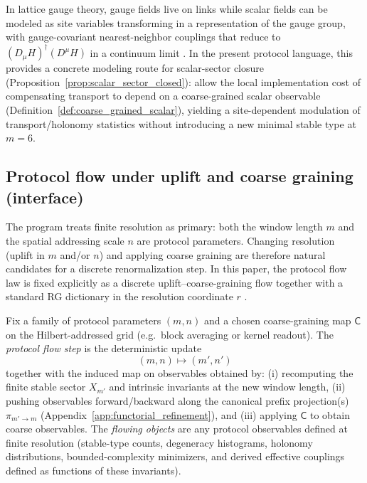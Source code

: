 \begin{remark}
In lattice gauge theory, gauge fields live on links while scalar fields can be modeled as site variables transforming in a representation of the gauge group, with gauge-covariant nearest-neighbor couplings that reduce to $(D_\mu H)^\dagger(D^\mu H)$ in a continuum limit \cite{Wilson1974,KogutSusskind1975HamiltonianLGT,Rothe2012}.
In the present protocol language, this provides a concrete modeling route for scalar-sector closure (Proposition~\ref{prop:scalar_sector_closed}): allow the local implementation cost of compensating transport to depend on a coarse-grained scalar observable (Definition~\ref{def:coarse_grained_scalar}), yielding a site-dependent modulation of transport/holonomy statistics without introducing a new minimal stable type at $m=6$.
\end{remark}

\subsection{Protocol flow under uplift and coarse graining (interface)}
\label{subsec:protocol_flow_interface}

The program treats finite resolution as primary: both the window length $m$ and the spatial addressing scale $n$ are protocol parameters.
Changing resolution (uplift in $m$ and/or $n$) and applying coarse graining are therefore natural candidates for a discrete renormalization step.
In this paper, the protocol flow law is fixed explicitly as a discrete uplift--coarse-graining flow together with a standard RG dictionary in the resolution coordinate $r$ \cite{Wilson1974,Rothe2012}.


\begin{definition}\label{def:protocol_flow_step}
Fix a family of protocol parameters $(m,n)$ and a chosen coarse-graining map $\mathsf{C}$ on the Hilbert-addressed grid (e.g.\ block averaging or kernel readout).
The \emph{protocol flow step} is the deterministic update
\[
(m,n)\mapsto(m',n')
\]
together with the induced map on observables obtained by:
(i) recomputing the finite stable sector $X_{m'}$ and intrinsic invariants at the new window length,
(ii) pushing observables forward/backward along the canonical prefix projection(s) $\pi_{m'\to m}$ (Appendix~\ref{app:functorial_refinement}),
and (iii) applying $\mathsf{C}$ to obtain coarse observables.
The \emph{flowing objects} are any protocol observables defined at finite resolution (stable-type counts, degeneracy histograms, holonomy distributions, bounded-complexity minimizers, and derived effective couplings defined as functions of these invariants).
\end{definition}

